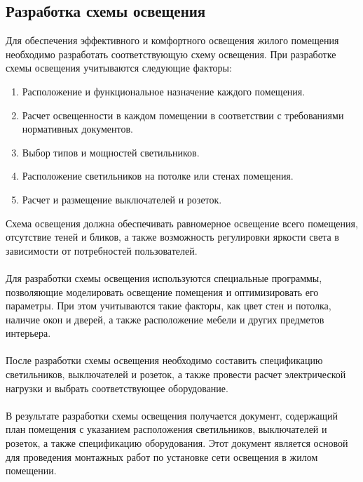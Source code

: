 \documentclass{article}
\begin{document}
\subsection{Разработка схемы освещения}
Для обеспечения эффективного и комфортного освещения жилого помещения необходимо разработать соответствующую схему освещения. При разработке схемы освещения учитываются следующие факторы:
\begin{enumerate}
\item Расположение и функциональное назначение каждого помещения.
\item Расчет освещенности в каждом помещении в соответствии с требованиями нормативных документов.
\item Выбор типов и мощностей светильников.
\item Расположение светильников на потолке или стенах помещения.
\item Расчет и размещение выключателей и розеток.
\end{enumerate}
Схема освещения должна обеспечивать равномерное освещение всего помещения, отсутствие теней и бликов, а также возможность регулировки яркости света в зависимости от потребностей пользователей.\\
~\\
Для разработки схемы освещения используются специальные программы, позволяющие моделировать освещение помещения и оптимизировать его параметры. При этом учитываются такие факторы, как цвет стен и потолка, наличие окон и дверей, а также расположение мебели и других предметов интерьера.\\
~\\
После разработки схемы освещения необходимо составить спецификацию светильников, выключателей и розеток, а также провести расчет электрической нагрузки и выбрать соответствующее оборудование.\\
~\\
В результате разработки схемы освещения получается документ, содержащий план помещения с указанием расположения светильников, выключателей и розеток, а также спецификацию оборудования. Этот документ является основой для проведения монтажных работ по установке сети освещения в жилом помещении.
\end{document}
